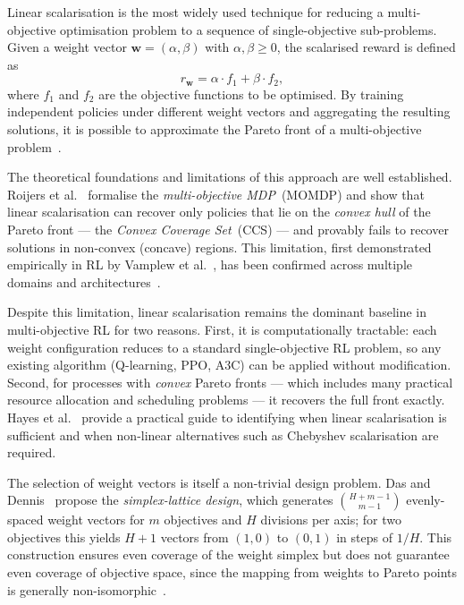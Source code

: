 Linear scalarisation is the most widely used technique for reducing a
multi-objective optimisation problem to a sequence of single-objective
sub-problems.  Given a weight vector $\mathbf{w} = (\alpha, \beta)$ with
$\alpha, \beta \ge 0$, the scalarised reward is defined as
\begin{equation}
\label{eq:scalar}
r_{\mathbf{w}} = \alpha \cdot f_1 + \beta \cdot f_2,
\end{equation}
where $f_1$ and $f_2$ are the objective functions to be optimised.  By
training independent policies under different weight vectors and aggregating
the resulting solutions, it is possible to approximate the Pareto front of a
multi-objective problem~\cite{Roijers2013ADecision-Making}.

The theoretical foundations and limitations of this approach are well
established.  Roijers et al.~\cite{Roijers2013ADecision-Making} formalise the
\emph{multi-objective MDP}~(MOMDP) and show that linear scalarisation can
recover only policies that lie on the \emph{convex hull} of the Pareto front
--- the \emph{Convex Coverage Set}~(CCS) --- and provably fails to recover
solutions in non-convex (concave) regions.  This limitation, first
demonstrated empirically in RL by Vamplew et
al.~\cite{Vamplew2008OnFronts}, has been confirmed across multiple domains
and architectures~\cite{Hayes2022APlanning}.

Despite this limitation, linear scalarisation remains the dominant baseline in
multi-objective RL for two reasons.  First, it is computationally tractable:
each weight configuration reduces to a standard single-objective RL problem,
so any existing algorithm (Q-learning, PPO, \ac{A3C}) can be applied without
modification.  Second, for processes with \emph{convex} Pareto fronts ---
which includes many practical resource allocation and scheduling problems ---
it recovers the full front exactly.  Hayes et al.~\cite{Hayes2022APlanning}
provide a practical guide to identifying when linear scalarisation is
sufficient and when non-linear alternatives such as Chebyshev scalarisation
are required.

The selection of weight vectors is itself a non-trivial design problem.  Das
and Dennis~\cite{DasNormalBoundaryIntersection1998} propose the \emph{simplex-lattice
design}, which generates $\binom{H+m-1}{m-1}$ evenly-spaced weight vectors
for $m$ objectives and $H$ divisions per axis; for two objectives this yields
$H+1$ vectors from $(1,0)$ to $(0,1)$ in steps of $1/H$.  This construction
ensures even coverage of the weight simplex but does not guarantee even
coverage of objective space, since the mapping from weights to Pareto points
is generally non-isomorphic~\cite{Vamplew2008OnFronts}.

